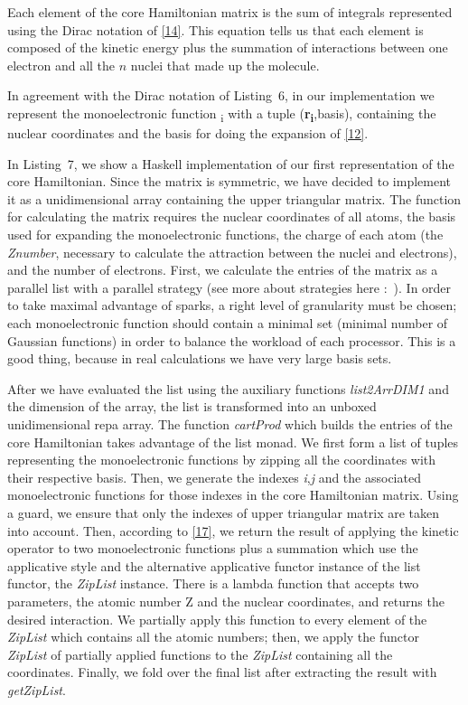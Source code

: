 \documentclass{tmr}
\begin{document}
Each element of the core Hamiltonian matrix is the sum of integrals represented using
the Dirac notation of \eqref{14}. This equation tells us that each element is composed
of the kinetic energy plus the summation of interactions between one electron and all the $n$
nuclei that made up the molecule.

In agreement with the Dirac notation of Listing~6, in our implementation we represent the
monoelectronic function \textchi \textsubscript{i} with a tuple 
(\textbf{r\textsubscript{i}},basis), containing the nuclear coordinates 
and the basis for doing the expansion of \eqref{12}.

In Listing~7, we show a Haskell implementation of our first representation of 
the core Hamiltonian. Since the matrix is symmetric, we have decided to implement it
as a unidimensional array containing the upper triangular matrix.
The function for calculating the matrix requires the nuclear coordinates of all atoms, the basis used
for expanding the monoelectronic functions, the charge of each atom (the \textit{Znumber}, necessary to
calculate the attraction between the nuclei and electrons), and the number of electrons. First, we
calculate the entries of the matrix as a parallel list with a parallel strategy
(see more about strategies here :~\cite{strategies}). In order to take maximal advantage
of sparks, a right level of granularity must be chosen;
each monoelectronic function should contain
a minimal set (minimal number of Gaussian functions) in order to balance the workload
of each processor.
This is a good thing, because in real calculations we have very large basis sets.

After we have evaluated the list using the auxiliary functions \textit{list2ArrDIM1}
and the dimension of the array, the list is transformed into an unboxed unidimensional repa array.
The function \textit{cartProd} which builds the entries of the core Hamiltonian
takes advantage of the list monad. We first form a list of tuples representing the monoelectronic
functions by zipping all the coordinates with their respective basis. Then, we generate the
indexes \textit{i},\textit{j} and the associated monoelectronic functions for those 
indexes in the core Hamiltonian matrix. Using a guard, we ensure that only the indexes of
upper triangular matrix are taken into account. Then, according to \eqref{17}, we return
the result of applying the kinetic operator to two monoelectronic functions plus a summation
which use the applicative style and the alternative applicative functor instance of the list functor, the
\textit{ZipList} instance. There is a lambda function that accepts two parameters, the atomic number Z and
the nuclear coordinates, and returns the desired interaction.  We partially apply this function
to every element of the \textit{ZipList} which contains all the atomic numbers; then, we apply the 
functor \textit{ZipList} of partially applied functions to the \textit{ZipList} 
containing all the coordinates. Finally, we fold over the final list after extracting
the result with \textit{getZipList}.
\end{document}

